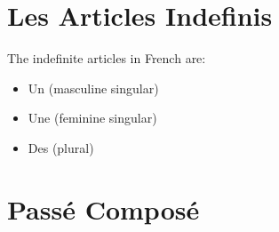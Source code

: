 \documentclass{book}
\begin{document}
\newpage

\section{Les Articles Indefinis}
The indefinite articles in French are:
\begin{itemize}
    \item Un (masculine singular)
    \item Une (feminine singular)
    \item Des (plural)
\end{itemize}

\newpage

\section{Passé Composé}
\end{document}
